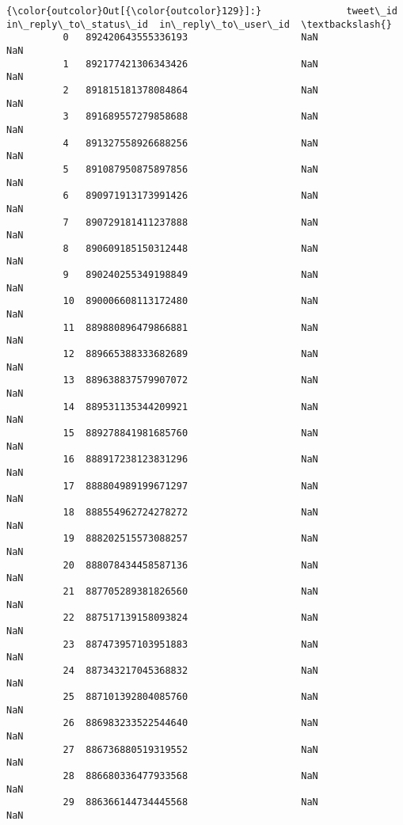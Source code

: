 \documentclass[11pt]{article}
\begin{document}
\begin{Verbatim}[commandchars=\\\{\}]
{\color{outcolor}Out[{\color{outcolor}129}]:}               tweet\_id  in\_reply\_to\_status\_id  in\_reply\_to\_user\_id  \textbackslash{}
          0   892420643555336193                    NaN                  NaN   
          1   892177421306343426                    NaN                  NaN   
          2   891815181378084864                    NaN                  NaN   
          3   891689557279858688                    NaN                  NaN   
          4   891327558926688256                    NaN                  NaN   
          5   891087950875897856                    NaN                  NaN   
          6   890971913173991426                    NaN                  NaN   
          7   890729181411237888                    NaN                  NaN   
          8   890609185150312448                    NaN                  NaN   
          9   890240255349198849                    NaN                  NaN   
          10  890006608113172480                    NaN                  NaN   
          11  889880896479866881                    NaN                  NaN   
          12  889665388333682689                    NaN                  NaN   
          13  889638837579907072                    NaN                  NaN   
          14  889531135344209921                    NaN                  NaN   
          15  889278841981685760                    NaN                  NaN   
          16  888917238123831296                    NaN                  NaN   
          17  888804989199671297                    NaN                  NaN   
          18  888554962724278272                    NaN                  NaN   
          19  888202515573088257                    NaN                  NaN   
          20  888078434458587136                    NaN                  NaN   
          21  887705289381826560                    NaN                  NaN   
          22  887517139158093824                    NaN                  NaN   
          23  887473957103951883                    NaN                  NaN   
          24  887343217045368832                    NaN                  NaN   
          25  887101392804085760                    NaN                  NaN   
          26  886983233522544640                    NaN                  NaN   
          27  886736880519319552                    NaN                  NaN   
          28  886680336477933568                    NaN                  NaN   
          29  886366144734445568                    NaN                  NaN   

\end{Verbatim}
\end{document}
